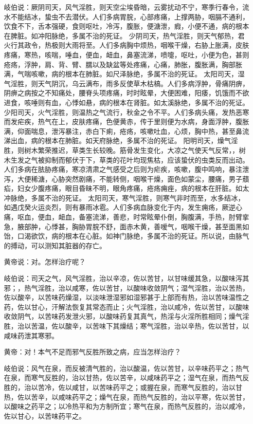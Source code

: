 \documentclass[12pt,UTF8]{ctexbook}
\begin{document}
岐伯说：厥阴司天，风气淫胜，则天空尘埃昏暗，云雾扰动不宁，寒季行春令，流水不能结冰，蛰虫不去潜伏。人们多病胃脘，心部疼痛，上撑两胁，咽膈不通利，饮食不下，舌本强硬，食则呕吐，冷泻，腹胀，便溏泄，瘕，小便不通，病的根本在脾脏。如冲阳脉绝，多属不治的死证。
少阴司天，热气淫胜，则天气郁热，君火行其政令，热极则大雨将至。人们多病胸中烦热，咽喉干燥，右胁上胀满，皮肤疼痛，寒热，咳喘，唾血，便血，衄血，鼻塞流涕，喷嚏，呕吐，小便为色，甚则疮疡，浮肿，肩、背、臂、臑以及缺盆等处疼痛，心痛，肺胀，腹胀满，胸部胀满，气喘咳嗽，病的根本在肺脏。如尺泽脉绝，多属不治的死证。
太阳司天，湿气淫胜，则天气阴沉，乌云满布，雨多反使草木枯槁。人们多病浮肿，骨痛阴痹，阴痹之病按之不知痛处，腰脊头项疼痛，时时眩晕，大便困难，阳痿，饥饿而不欲进食，咳唾则有血，心悸如悬，病的根本在肾脏。如太溪脉绝，多属不治的死证。
少阳司天，火气淫胜，则温热之气流行，秋金之令不平。人们多病头痛，发热恶寒而发疟疾，热气在上，皮肤疼痛，色便黄赤，传于里则便为水病，身面浮肿，腹胀满，仰面喘息，泄泻暴注，赤白下痢，疮疡，咳嗽吐血，心烦，胸中热，甚至鼻流涕出血，病的根本在肺脏。如天府脉绝，多属不治的死证。
阳明司天，燥气淫胜，则树木繁荣推迟，草类生长较晚。筋骨发生变化，大凉之气使天气反常，，树木生发之气被抑制而郁伏于下，草类的花叶均现焦枯，应该蛰伏的虫类反而出动。人们多病在胠胁疼痛，寒凉清肃之气感受之后则为疟疾，咳嗽，腹中鸣响，暴注泄泻，大便稀溏，心胁突然剧痛，不能转侧，咽喉干燥，面色如蒙尘，腰痛，男子蘈疝，妇女少腹疼痛，眼目昏昧不明，眼角疼痛，疮疡痈痤，病的根本在肝脏。如太冲脉绝，多属不治的死证。
太阳司天，寒气淫胜，则寒气非时而至，水多结冰，如遇戊癸火运炎烈，则有暴雨冰雹。人们多病血脉变化于内，发生痈疡，厥逆心痛，呕血，便血，衄血，备塞流涕，善悲，时常眩晕仆倒，胸腹满，手热，肘臂挛急，腋部肿，心悸甚，胸胁胃脘不舒，面赤木黄，善嗳气，咽喉干燥，甚至面黑如饴，口渴欲饮，病的根本在心脏。如神门脉绝，多属不治的死证。所以说，由脉气的搏动，可以测知其脏器的存亡。

黄帝说：对。怎样治疗呢？

岐伯说：司天之气，风气淫胜，治以辛凉，佐以苦甘，以甘味缓其急，以酸味泻其邪；，热气淫胜，治以咸寒，佐以苦甘，以酸味收敛阴气；湿气淫胜，治以苦热，佐以酸辛，以苦味药燥湿，以淡味泄湿邪如湿邪甚于上部而有热，治以苦味温性之药，佐以甘心，汗解法恢复其常态而止；火气淫胜，治以咸冷，佐以苦甘，以酸味收敛阴气，以苦味药发泄火邪，以酸味药复其真气，热淫与火淫所胜相同；燥气淫胜，治以苦温，佐以酸辛，以苦味下其燥结；寒气淫胜，治以辛热，佐以苦甘，以咸味药泄其寒邪。

黄帝：对！本气不足而邪气反胜所致之病，应当怎样治疗？

岐伯说：风气在泉，而反被清气胜的，治以酸温，佐以苦甘，以辛味药平之；热气在泉，而寒气反胜的，治以甘热，佐以苦辛，以咸味药平之；湿气在泉，而热气反胜的，治以苦冷，佐以咸甘，以苦味药平之；或握在泉，而寒气反胜的，治以甘热，佐以苦辛，以咸味药平之；燥气在泉，而热气反胜的，治以平寒，佐以苦甘，以酸味之药平之；以冷热平和为方制所宜；寒气在泉，而热气反胜的，治以咸冷，佐以甘心，以苦味药平之。
\end{document}
